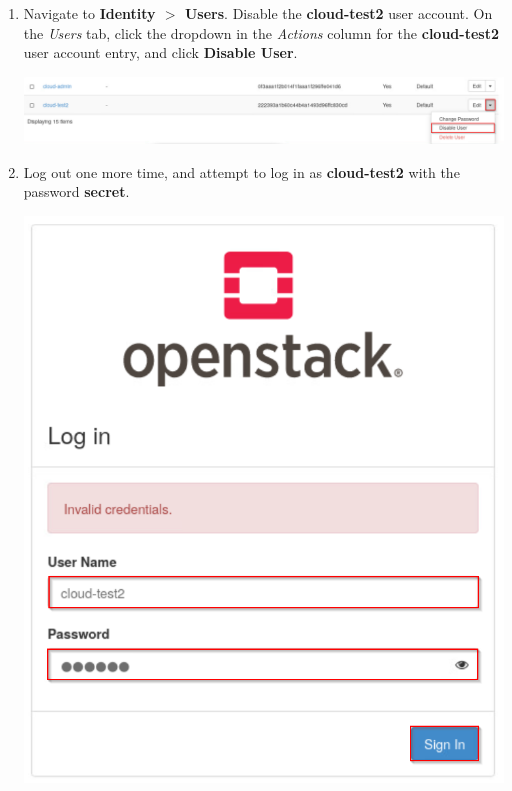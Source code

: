 \documentclass[letterpaper, 12pt]{article}
\begin{document}
\begin{enumerate}
    \item Navigate to \textbf{Identity $>$ Users}.
    Disable the \textbf{cloud-test2} user account. On the \textit{Users} tab, click the dropdown in the \textit{Actions} column for the \textbf{cloud-test2} user account entry, and click \textbf{Disable User}.

    \begin{center}
        \includegraphics[width=\linewidth]{images/part3/step13.png}
    \end{center}

    \item Log out one more time, and attempt to log in as \textbf{cloud-test2} with the password \textbf{secret}.

    \begin{center}
        \includegraphics[scale=0.5]{images/part3/step14.png}
    \end{center}


\end{enumerate}
\end{document}
